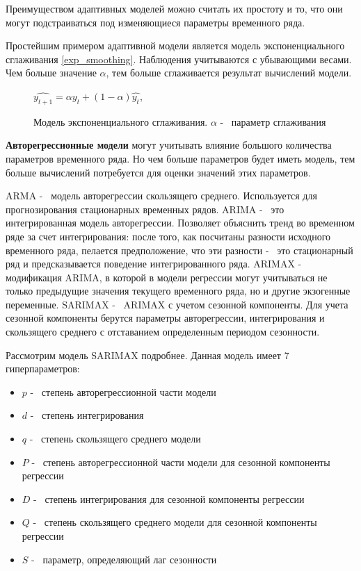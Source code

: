 Преимуществом адаптивных моделей можно считать их простоту и то, что они могут подстраиваться
под изменяющиеся параметры временного ряда.

Простейшим примером адаптивной модели является модель экспоненциального сглаживания \ref{exp_smoothing}.
Наблюдения учитываются с убывающими весами. %
Чем больше значение $ \alpha $, тем больше сглаживается результат вычислений модели.

\def\figurename{Формула}
\begin{figure}[t]
	\centering
	$ \hat{y_{t+1}} = \alpha y_t + (1 - \alpha)\hat{y_t} $,
	\caption{
		Модель экспоненциального сглаживания.
		$ \alpha $ -~ параметр сглаживания
	}
	\label{img:exp_smoothing}
\end{figure}
\def\figurename{Рис.}


\textbf{Авторегрессионные модели} могут учитывать влияние большого количества параметров
временного ряда. Но чем больше параметров будет иметь модель, тем больше вычислений
потребуется для оценки значений этих параметров.

ARMA -~ модель авторегрессии скользящего среднего. Используется для прогнозирования
стационарных временных рядов.
ARIMA -~ это интегрированная модель авторегрессии. Позволяет объяснить тренд во временном
ряде за счет интегрирования: после того, как посчитаны разности исходного временного ряда,
пелается предположение, что эти разности -~ это стационарный ряд и предсказывается поведение
интегрированного ряда.
ARIMAX -~ модификация ARIMA, в которой в модели регрессии могут учитываться не только предыдущие значения
текущего временного ряда, но и другие экзогенные переменные.
SARIMAX -~ ARIMAX с учетом сезонной компоненты. Для учета сезонной компоненты
берутся параметры авторегрессии, интегрирования и скользящего среднего с отставанием
определенным периодом сезонности.

Рассмотрим модель SARIMAX подробнее. Данная модель имеет 7 гиперпараметров:
\begin{itemize}
	\item $ p $ -~ степень авторегрессионной части модели
	\item $ d $ -~ степень интегрирования
	\item $ q $ -~ степень скользящего среднего модели
	\item $ P $ -~ степень авторегрессионной части модели для сезонной компоненты регрессии
	\item $ D $ -~ степень интегрирования для сезонной компоненты регрессии
	\item $ Q $ -~ степень скользящего среднего модели для сезонной компоненты регрессии
	\item $ S $ -~ параметр, определяющий лаг сезонности
\end{itemize}

